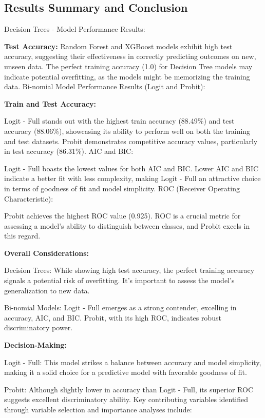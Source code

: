 \documentclass[
]{article}
\begin{document}
\newpage

\hypertarget{results-summary-and-conclusion}{%
\subsection{Results Summary and
Conclusion}\label{results-summary-and-conclusion}}

Decision Trees - Model Performance Results:

\textbf{Test Accuracy:} Random Forest and XGBoost models exhibit high
test accuracy, suggesting their effectiveness in correctly predicting
outcomes on new, unseen data. The perfect training accuracy (1.0) for
Decision Tree models may indicate potential overfitting, as the models
might be memorizing the training data. Bi-nomial Model Performance
Results (Logit and Probit):

\textbf{Train and Test Accuracy:}

Logit - Full stands out with the highest train accuracy (88.49\%) and
test accuracy (88.06\%), showcasing its ability to perform well on both
the training and test datasets. Probit demonstrates competitive accuracy
values, particularly in test accuracy (86.31\%). AIC and BIC:

Logit - Full boasts the lowest values for both AIC and BIC. Lower AIC
and BIC indicate a better fit with less complexity, making Logit - Full
an attractive choice in terms of goodness of fit and model simplicity.
ROC (Receiver Operating Characteristic):

Probit achieves the highest ROC value (0.925). ROC is a crucial metric
for assessing a model's ability to distinguish between classes, and
Probit excels in this regard.

\textbf{Overall Considerations:}

Decision Trees: While showing high test accuracy, the perfect training
accuracy signals a potential risk of overfitting. It's important to
assess the model's generalization to new data.

Bi-nomial Models: Logit - Full emerges as a strong contender, excelling
in accuracy, AIC, and BIC. Probit, with its high ROC, indicates robust
discriminatory power.

\textbf{Decision-Making:}

Logit - Full: This model strikes a balance between accuracy and model
simplicity, making it a solid choice for a predictive model with
favorable goodness of fit.

Probit: Although slightly lower in accuracy than Logit - Full, its
superior ROC suggests excellent discriminatory ability. Key contributing
variables identified through variable selection and importance analyses
include:
\end{document}
